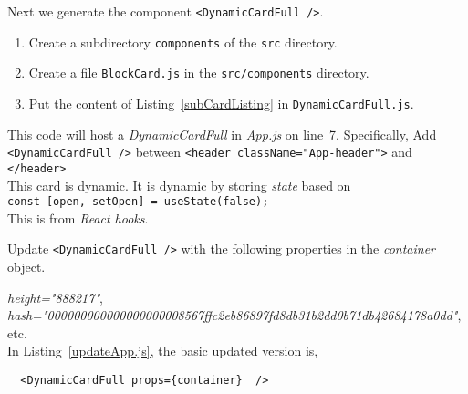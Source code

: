 \documentclass[12pt]{article}
\begin{document}
Next we generate the component \lstinline[style=JSES6Base]|<DynamicCardFull />|.

\begin{enumerate}

  \item Create a subdirectory \lstinline[language=bash]|components| of the \lstinline[language=bash]|src| directory.
  
  \item Create a file \lstinline[language=bash]|BlockCard.js| in the \lstinline[language=bash]|src/components| directory.

  \item Put the content of Listing~\ref{subCardListing} in \lstinline[language=bash]|DynamicCardFull.js|.

\end{enumerate}


This code will host a {\em DynamicCardFull} in {\em App.js} on line~7. 
Specifically, 
Add \lstinline[style=JSES6Base]|<DynamicCardFull />| between \lstinline[style=JSES6Base]|<header className="App-header">|  and  \lstinline[style=JSES6Base]|</header>|\\

This card is dynamic.
It is dynamic by storing {\em state} based on\\
\lstinline[style=JSES6Base]|const [open, setOpen] = useState(false);|\\
This is from {\em React hooks}.


Update \lstinline[style=JSES6Base]|<DynamicCardFull />| with the following 
properties in the {\em container} object. 

{\em height="888217"}, \\
{\em hash="000000000000000000008567ffc2eb86897fd8db31b2dd0b71db42684178a0dd"}, 
etc.\\

In Listing~\ref{updateApp.js}, the basic updated version is,\\

\begin{lstlisting}
  <DynamicCardFull props={container}  />
\end{lstlisting}
\end{document}
